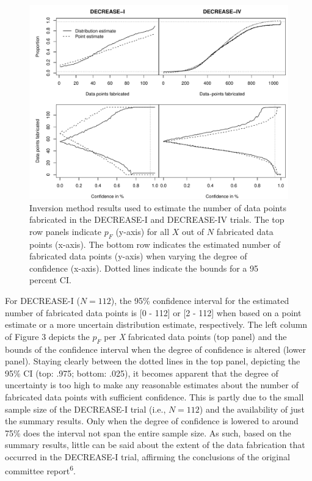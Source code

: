 \documentclass[]{article}
\begin{document}
\begin{figure}

{\centering \includegraphics[width=0.8\linewidth]{../figures/fig3} 

}

\caption{Inversion method results used to estimate the number of data points fabricated in the DECREASE-I and DECREASE-IV trials. The top row panels indicate $p_F$ (y-axis) for all $X$ out of $N$ fabricated data points (x-axis). The bottom row indicates the estimated number of fabricated data points (y-axis) when varying the degree of confidence (x-axis). Dotted lines indicate the bounds for a 95 percent CI.}\label{fig:figure 3}
\end{figure}

For DECREASE-I (\(N=112\)), the 95\% confidence interval for the
estimated number of fabricated data points is {[}0 - 112{]} or {[}2 -
112{]} when based on a point estimate or a more uncertain distribution
estimate, respectively. The left column of Figure 3 depicts the \(p_F\)
per \emph{X} fabricated data points (top panel) and the bounds of the
confidence interval when the degree of confidence is altered (lower
panel). Staying clearly between the dotted lines in the top panel,
depicting the 95\% CI (top: .975; bottom: .025), it becomes apparent
that the degree of uncertainty is too high to make any reasonable
estimates about the number of fabricated data points with sufficient
confidence. This is partly due to the small sample size of the
DECREASE-I trial (i.e., \(N=112\)) and the availability of just the
summary results. Only when the degree of confidence is lowered to around
75\% does the interval not span the entire sample size. As such, based
on the summary results, little can be said about the extent of the data
fabrication that occurred in the DECREASE-I trial, affirming the
conclusions of the original committee report\textsuperscript{6}.
\end{document}
